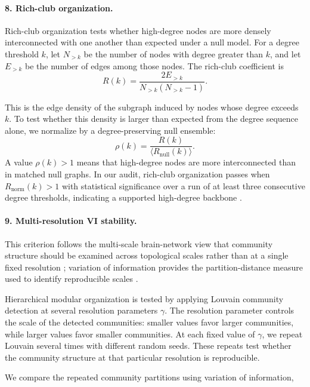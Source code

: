 \documentclass[12pt]{article}
\begin{document}
\paragraph{8. Rich-club organization.}
Rich-club organization tests whether high-degree nodes are more densely
interconnected with one another than expected under a null model. For a
degree threshold $k$, let $N_{>k}$ be the number of nodes with degree
greater than $k$, and let $E_{>k}$ be the number of edges among those
nodes. The rich-club coefficient is
\[
R(k)
=
\frac{2E_{>k}}{N_{>k}(N_{>k}-1)} .
\]





This is the edge density of the subgraph induced by nodes whose degree
exceeds $k$. To test whether this density is larger than expected from
the degree sequence alone, we normalize by a degree-preserving null
ensemble:
\[
\rho(k)=\frac{R(k)}
{\langle R_{\mathrm{null}}(k) \rangle}.
\]
A value $\rho(k)>1$ means that high-degree nodes are more
interconnected than in matched null graphs. In our audit, rich-club
organization passes when $R_{\mathrm{norm}}(k)>1$ with statistical significance over a run of at least three consecutive degree thresholds, indicating a supported high-degree backbone \cite{Colizza2006,vandenHeuvel2011}.

\paragraph{9. Multi-resolution VI stability.}

This criterion follows the multi-scale brain-network view that community
structure should be examined across topological scales rather than at a
single fixed resolution \cite{BetzelBassett2017}; variation of information
provides the partition-distance measure used to identify reproducible
scales \cite{Meila2007}.

Hierarchical modular organization is tested by applying Louvain community
detection at several resolution parameters $\gamma$. The resolution
parameter controls the scale of the detected communities: smaller values
favor larger communities, while larger values favor smaller communities.
At each fixed value of $\gamma$, we repeat Louvain several times with
different random seeds. These repeats test whether the community structure
at that particular resolution is reproducible.

We compare the repeated community partitions using variation of
information,
\end{document}
